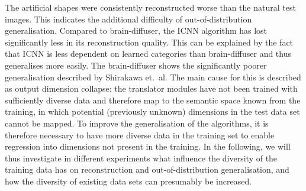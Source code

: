 The artificial shapes were consistently  reconstructed worse than the natural test images. This indicates the additional difficulty of out-of-distribution generalisation. Compared to brain-diffuser, the ICNN algorithm has lost significantly less in its reconstruction quality. This can be explained by the fact that ICNN is less dependent on learned categories than brain-diffuser and thus generalises more easily. The brain-diffuser shows the significantly poorer generalisation described by Shirakawa et.\ al.\cite{shirakawaSpuriousReconstructionBrain2024} The main cause for this is described as output dimension collapse: the translator modules have not been trained with sufficiently diverse data and therefore map to the semantic space known from the training, in which potential (previously unknown) dimensions in the test data set cannot be mapped. To improve the generalisation of the algorithms, it is therefore necessary to have more diverse data in the training set to enable regression into dimensions not present in the training. In the following, we will thus investigate in different experiments what influence the diversity of the training data has on reconstruction and out-of-distribution generalisation, and how the diversity of existing data sets can presumably be increased. 